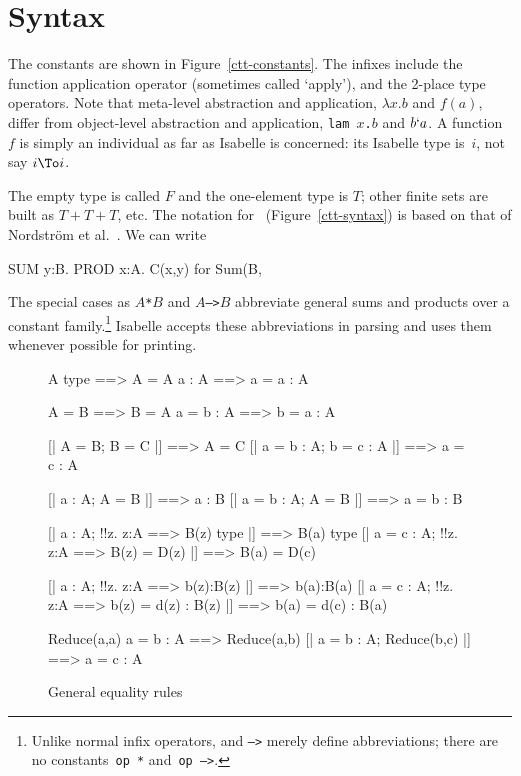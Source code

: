

\section{Syntax}
The constants are shown in Figure~\ref{ctt-constants}.  The infixes include
the function application operator (sometimes called `apply'), and the
2-place type operators.  Note that meta-level abstraction and application,
$\lambda x.b$ and $f(a)$, differ from object-level abstraction and
application, \hbox{\tt lam $x$.$b$} and $b{\tt`}a$.  A {\CTT}
function~$f$ is simply an individual as far as Isabelle is concerned: its
Isabelle type is~$i$, not say $i\To i$.

The empty type is called $F$ and the one-element type is $T$; other finite
sets are built as $T+T+T$, etc.  The notation for~{\CTT}
(Figure~\ref{ctt-syntax}) is based on that of Nordstr\"om et
al.~\cite{nordstrom90}.  We can write
\begin{ttbox}
SUM y:B. PROD x:A. C(x,y)   {\rm for}   Sum(B, %
\end{ttbox}
The special cases as \hbox{\tt$A$*$B$} and \hbox{\tt$A$-->$B$} abbreviate
general sums and products over a constant family.\footnote{Unlike normal
infix operators, {\tt*} and {\tt-->} merely define abbreviations; there are
no constants~{\tt op~*} and~\hbox{\tt op~-->}.}  Isabelle accepts these
abbreviations in parsing and uses them whenever possible for printing.


\begin{figure} 
\begin{ttbox}
         A type ==> A = A
         a : A ==> a = a : A

          A = B ==> B = A
          a = b : A ==> b = a : A

        [| A = B;  B = C |] ==> A = C
        [| a = b : A;  b = c : A |] ==> a = c : A

       [| a : A;  A = B |] ==> a : B
      [| a = b : A;  A = B |] ==> a = b : B

        [| a : A;  !!z. z:A ==> B(z) type |] ==> B(a) type
       [| a = c : A;  !!z. z:A ==> B(z) = D(z) 
                  |] ==> B(a) = D(c)

        [| a : A;  !!z. z:A ==> b(z):B(z) |] ==> b(a):B(a)
       [| a = c : A;  !!z. z:A ==> b(z) = d(z) : B(z) 
                  |] ==> b(a) = d(c) : B(a)

          Reduce(a,a)
      a = b : A ==> Reduce(a,b)
         [| a = b : A;  Reduce(b,c) |] ==> a = c : A
\end{ttbox}
\caption{General equality rules} \label{ctt-equality}
\end{figure}


